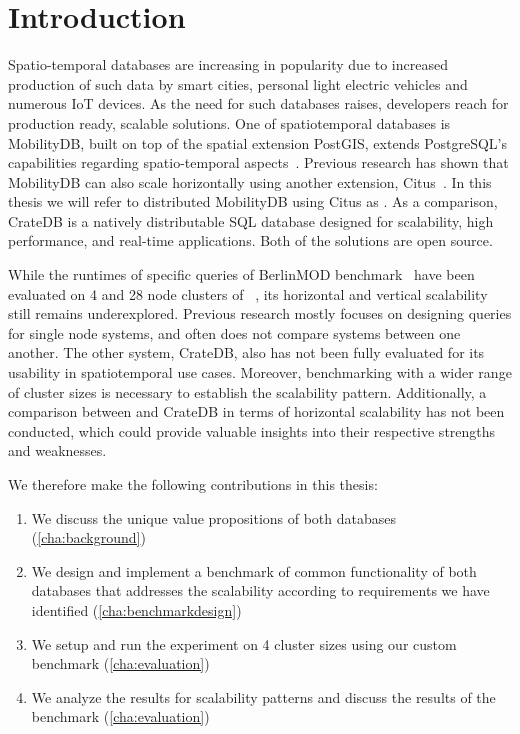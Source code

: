 \section{Introduction}
\label{cha:introduction}

Spatio-temporal databases are increasing in popularity due to increased production of such data by smart cities, personal light electric vehicles and numerous IoT devices.
As the need for such databases raises, developers reach for production ready, scalable solutions.
One of spatiotemporal databases is MobilityDB, built on top of the spatial extension PostGIS, extends PostgreSQL's capabilities regarding spatio-temporal aspects~\cite{zimanyiMobilityDBMobilityDatabase2020}.
Previous research has shown that MobilityDB can also scale horizontally using another extension, Citus~\cite{bakliDistributedMobilityData2020,bakliDistributedMovingObject2019,cubukcuCitusDistributedPostgreSQL2021}.
In this thesis we will refer to distributed MobilityDB using Citus as \mobilitydbc.
As a comparison, CrateDB is a natively distributable SQL database designed for scalability, high performance, and real-time applications.
Both of the solutions are open source.

While the runtimes of specific queries of BerlinMOD benchmark~\cite{duntgenBerlinMODBenchmarkMoving2009} have been evaluated on 4 and 28 node clusters of \mobilitydbc~\cite{bakliDistributedMobilityData2020}, its horizontal and vertical scalability still remains underexplored.
Previous research mostly focuses on designing queries for single node systems, and often does not compare systems between one another. 
The other system, CrateDB, also has not been fully evaluated for its usability in spatiotemporal use cases.
Moreover, benchmarking with a wider range of cluster sizes is necessary to establish the scalability pattern.
Additionally, a comparison between \mobilitydbc and CrateDB in terms of horizontal scalability has not been conducted, which could provide valuable insights into their respective strengths and weaknesses.

We therefore make the following contributions in this thesis:
\begin{enumerate}
    \item We discuss the unique value propositions of both databases (\cref{cha:background})
    \item We design and implement a benchmark of common functionality of both databases that addresses the scalability according to requirements we have identified (\cref{cha:benchmarkdesign})
    \item We setup and run the experiment on 4 cluster sizes using our custom benchmark (\cref{cha:evaluation})
    \item We analyze the results for scalability patterns and discuss the results of the benchmark (\cref{cha:evaluation})
\end{enumerate}
